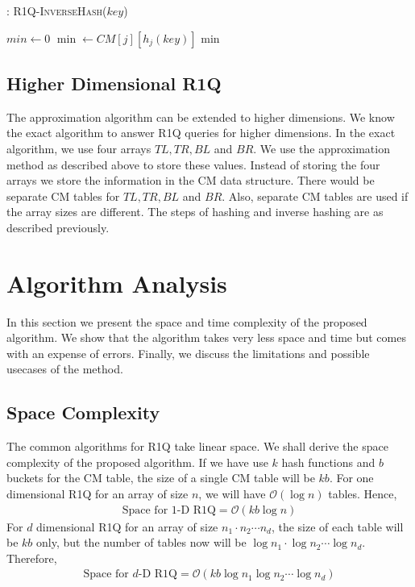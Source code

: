 \documentclass{article}
\begin{document}
\begin{algorithm}
\begin{algorithmic}[1]
\caption{: \textsc{R1Q-InverseHash}($key$)}
\label{r1qishashed}
\medskip
\STATE $min \gets 0$
\medskip
{}
		\STATE $\min \gets CM[j][h_j(key)]$
	\ENDIF
\ENDFOR
\medskip
\RETURN min
\medskip
\end{algorithmic}
\end{algorithm}

\subsection{Higher Dimensional R1Q}
\label{highdimr1q}
The approximation algorithm can be extended to higher dimensions. We know the exact algorithm to answer R1Q queries for higher dimensions. In the exact algorithm, we use four arrays $TL, TR, BL$ and $BR$. We use the approximation method as described above to store these values. Instead of storing the four arrays we store the information in the CM data structure. There would be separate CM tables for $TL, TR, BL$ and $BR$. Also, separate CM tables are used if the array sizes are different. The steps of hashing and inverse hashing are as described previously.

\section{Algorithm Analysis}
In this section we present the space and time complexity of the proposed algorithm. We show that the algorithm takes very less space and time but comes with an expense of errors. Finally, we discuss the limitations and possible usecases of the method.

\subsection{Space Complexity}
The common algorithms for R1Q take linear space. We shall derive the space complexity of the proposed algorithm. If we have use $k$ hash functions and $b$ buckets for the CM table, the size of a single CM table will be $kb$. For one dimensional R1Q for an array of size $n$, we will have $\mathcal{O}(\log n)$ tables. Hence,
\begin{align*}
\text{Space for 1-D R1Q} = \mathcal{O}(kb \log n)
\end{align*}
For $d$ dimensional R1Q for an array of size $n_1 \cdot n_2 \cdots n_d$, the size of each table will be $kb$ only, but the number of tables now will be $\log n_1 \cdot \log n_2 \cdots \log n_d$. Therefore,
\begin{align*}
\text{Space for $d$-D R1Q} = \mathcal{O}(kb \log n_1 \log n_2 \cdots \log n_d)
\end{align*}
\end{document}
